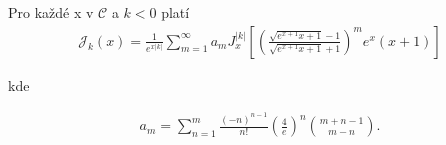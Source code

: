 \begin{theorem}
        Pro každé x v \(\mathcal{C}\) a \(k < 0\) platí
        \begin{align}
                \mathcal{J}_k(x) = \frac{1}{e^{x|k|}}\sum_{m=1}^\infty a_m 
                J_x^{|k|}\left[ \left( \frac{\sqrt{e^{x+1}x+1}-1}{\sqrt{
                e^{x+1}x + 1} +1}\right)^m e^x (x+1)\right]
        \end{align}
        
        kde
        
        \begin{align}
                a_m = \sum_{n=1}^{m}\frac{(-n)^{n-1}}{n!}\left( 
                \frac{4}{e}\right)^n \binom{m+n-1}{m-n}.
        \end{align}
\end{theorem}

